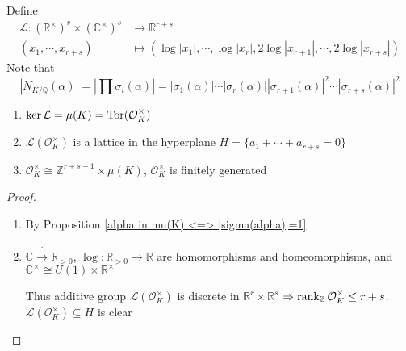 \documentclass[../main.tex]{subfiles}
\begin{document}
\begin{definition}
Define
\begin{align*}
\mathcal L:(\mathbb R^\times)^r\times(\mathbb C^\times)^s&\to\mathbb R^{r+s} \\
(x_1,\cdots,x_{r+s})&\mapsto(\log|x_1|,\cdots,\log|x_r|,2\log|x_{r+1}|,\cdots,2\log|x_{r+s}|)
\end{align*}
Note that
\[|N_{K/\mathbb Q}(\alpha)|=\left|\prod\sigma_i(\alpha)\right|=|\sigma_1(\alpha)|\cdots|\sigma_r(\alpha)||\sigma_{r+1}(\alpha)|^2\cdots|\sigma_{r+s}(\alpha)|^2\]
\end{definition}

\begin{theorem} \hfill
\begin{enumerate}[label=(\roman*)]
\item $\ker\mathcal L=\mu(K)=\operatorname{Tor}(\mathcal O_K^\times)$
\item $\mathcal L(\mathcal O_K^\times)$ is a lattice in the hyperplane $H=\{a_1+\cdots+a_{r+s}=0\}$
\item $\mathcal O_K^\times\cong\mathbb Z^{r+s-1}\times\mu(K)$, $\mathcal O_K^\times$ is finitely generated
\end{enumerate}
\end{theorem}

\begin{proof}
\begin{enumerate}[label=(\roman*)]
\item By Proposition \ref{alpha in mu(K) <=> |sigma(alpha)|=1}
\item $\mathbb C\xrightarrow{|\cdot|}\mathbb R_{>0}$, $\log:\mathbb R_{>0}\to\mathbb R$ are homomorphisms and homeomorphisms, and $\mathbb C^\times\cong U(1)\times\mathbb R^\times$
\begin{center}
\end{center}
Thus additive group $\mathcal L(\mathcal O_K^\times)$ is discrete in $\mathbb R^r\times\mathbb R^s$ $\Rightarrow \operatorname{rank}_{\mathbb Z}\mathcal O_K^\times\leq r+s$. $\mathcal L(\mathcal O_K^\times)\subseteq H$ is clear
\end{enumerate}
\end{proof}
\end{document}
